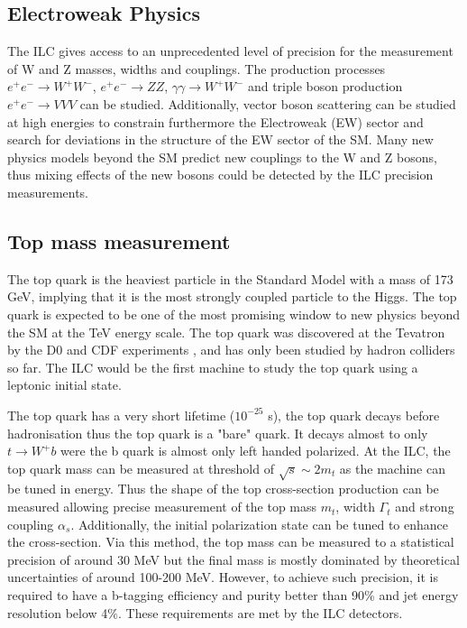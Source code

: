 \subsection{Electroweak Physics}

The ILC gives access to an unprecedented level of precision for the measurement of W and Z masses, widths and couplings. The production processes $e^+e^- \rightarrow W^+W^-$, $e^+e^- \rightarrow ZZ$, $\gamma\gamma \rightarrow W^+W^-$ and triple boson production $e^+e^- \rightarrow VVV$ can be studied. Additionally, vector boson scattering can be studied at high energies to constrain furthermore the Electroweak (EW) sector and search for deviations in the structure of the EW sector of the SM. Many new physics models beyond the SM predict new couplings to the W and Z bosons, thus mixing effects of the new bosons could be detected by the ILC precision measurements.

\subsection{Top mass measurement}

The top quark is the heaviest particle in the Standard Model with a mass of 173 GeV, implying that it is the most strongly coupled particle to the Higgs. The top quark is expected to be one of the most promising window to new physics beyond the SM at the TeV energy scale. The top quark was discovered at the Tevatron by the D0 and CDF experiments \cite{Abe:1995hr, D0:1995jca}, and has only been studied by hadron colliders so far. The ILC would be the first machine to study the top quark using a leptonic initial state.

The top quark has a very short lifetime ($10^{-25}$ s), the top quark decays before hadronisation thus the top quark is a "bare" quark. It decays almost to only $t \rightarrow W^+b$ were the b quark is almost only left handed polarized. At the ILC, the top quark mass can be measured at threshold of $\sqrt{s} \sim 2 m_t$ as the machine can be tuned in energy. Thus the shape of the top cross-section production can be measured allowing precise measurement of the top mass $m_t$, width $\Gamma_t$ and strong coupling $\alpha_s$. Additionally, the initial polarization state can be tuned to enhance the cross-section. Via this method, the top mass can be measured to a statistical precision of around 30 MeV but the final mass is mostly dominated by theoretical uncertainties of around 100-200 MeV. However, to achieve such precision, it is required to have a b-tagging efficiency and purity better than 90\% and jet energy resolution below 4\%. These requirements are met by the ILC detectors.

